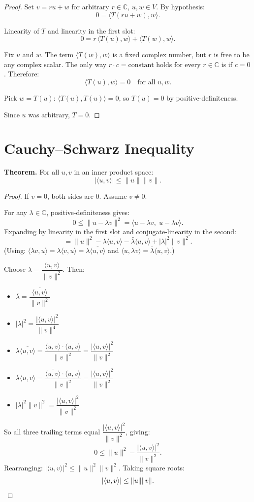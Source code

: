 \documentclass[12pt]{article}
\begin{document}
\begin{proof}
Set $v = ru + w$ for arbitrary $r \in \mathbb{C}$, $u, w \in V$. By hypothesis:
\[
0 = \langle T(ru + w), w \rangle.
\]

Linearity of $T$ and linearity in the first slot:
\[
0 = r\,\langle T(u), w \rangle + \langle T(w), w \rangle.
\]

Fix $u$ and $w$. The term $\langle T(w), w \rangle$ is a fixed complex number, but $r$ is free to be any complex scalar. The only way $r \cdot c = \text{constant}$ holds for every $r \in \mathbb{C}$ is if $c = 0$. Therefore:
\[
\langle T(u), w \rangle = 0 \quad \text{for all } u, w.
\]

Pick $w = T(u)$:
$\langle T(u), T(u) \rangle = 0$, so $T(u) = 0$ by positive-definiteness.

Since $u$ was arbitrary, $T = 0$.
\end{proof}

\section{Cauchy--Schwarz Inequality}

\textbf{Theorem.} For all $u, v$ in an inner product space:
\[
|\langle u, v \rangle| \le \|u\|\|v\|.
\]

\begin{proof}
If $v = 0$, both sides are $0$. Assume $v \neq 0$.

For any $\lambda \in \mathbb{C}$, positive-definiteness gives:
\[
0 \le \|u - \lambda v\|^2 = \langle u - \lambda v,\; u - \lambda v \rangle.
\]
Expanding by linearity in the first slot and conjugate-linearity in the second:
\[
= \|u\|^2 - \lambda\overline{\langle u,v\rangle} - \bar{\lambda}\langle u,v\rangle + |\lambda|^2\|v\|^2.
\]
(Using: $\langle \lambda v, u \rangle = \lambda\langle v, u\rangle = \lambda\overline{\langle u,v\rangle}$ and $\langle u, \lambda v\rangle = \bar{\lambda}\langle u,v\rangle$.)

Choose $\lambda = \dfrac{\langle u,v\rangle}{\|v\|^2}$. Then:
\begin{itemize}
    \item $\bar{\lambda} = \dfrac{\overline{\langle u,v\rangle}}{\|v\|^2}$
    \item $|\lambda|^2 = \dfrac{|\langle u,v\rangle|^2}{\|v\|^4}$
    \item $\lambda\overline{\langle u,v\rangle} = \dfrac{\langle u,v\rangle \cdot \overline{\langle u,v\rangle}}{\|v\|^2} = \dfrac{|\langle u,v\rangle|^2}{\|v\|^2}$
    \item $\bar{\lambda}\langle u,v\rangle = \dfrac{\overline{\langle u,v\rangle} \cdot \langle u,v\rangle}{\|v\|^2} = \dfrac{|\langle u,v\rangle|^2}{\|v\|^2}$
    \item $|\lambda|^2\|v\|^2 = \dfrac{|\langle u,v\rangle|^2}{\|v\|^2}$
\end{itemize}
So all three trailing terms equal $\dfrac{|\langle u,v\rangle|^2}{\|v\|^2}$, giving:
\[
0 \le \|u\|^2 - \frac{|\langle u,v\rangle|^2}{\|v\|^2}.
\]
Rearranging: $|\langle u,v\rangle|^2 \le \|u\|^2\|v\|^2$. Taking square roots:
\[
|\langle u,v\rangle| \le \|u\|\|v\|. \qedhere
\]
\end{proof}
\end{document}
